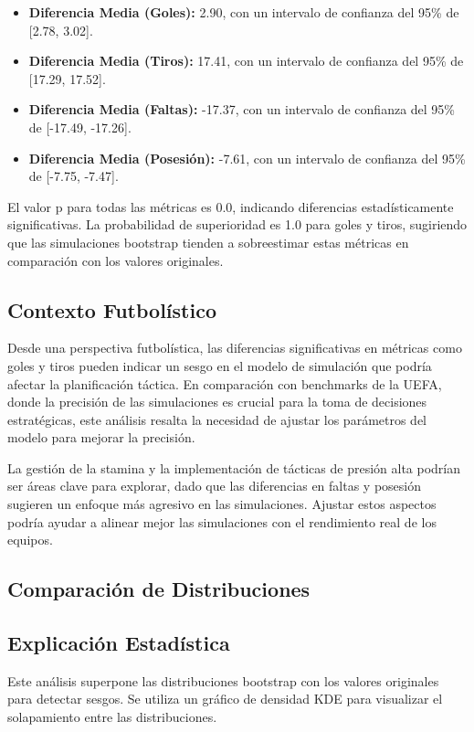 \documentclass{article}
\begin{document}
\begin{itemize}
    \item \textbf{Diferencia Media (Goles):} 2.90, con un intervalo de confianza del 95\% de [2.78, 3.02].
    \item \textbf{Diferencia Media (Tiros):} 17.41, con un intervalo de confianza del 95\% de [17.29, 17.52].
    \item \textbf{Diferencia Media (Faltas):} -17.37, con un intervalo de confianza del 95\% de [-17.49, -17.26].
    \item \textbf{Diferencia Media (Posesión):} -7.61, con un intervalo de confianza del 95\% de [-7.75, -7.47].
\end{itemize}

El valor p para todas las métricas es 0.0, indicando diferencias estadísticamente significativas. La probabilidad de superioridad es 1.0 para goles y tiros, sugiriendo que las simulaciones bootstrap tienden a sobreestimar estas métricas en comparación con los valores originales.

\subsection*{Contexto Futbolístico}
Desde una perspectiva futbolística, las diferencias significativas en métricas como goles y tiros pueden indicar un sesgo en el modelo de simulación que podría afectar la planificación táctica. En comparación con benchmarks de la UEFA, donde la precisión de las simulaciones es crucial para la toma de decisiones estratégicas, este análisis resalta la necesidad de ajustar los parámetros del modelo para mejorar la precisión.

La gestión de la stamina y la implementación de tácticas de presión alta podrían ser áreas clave para explorar, dado que las diferencias en faltas y posesión sugieren un enfoque más agresivo en las simulaciones. Ajustar estos aspectos podría ayudar a alinear mejor las simulaciones con el rendimiento real de los equipos.

\subsection{Comparación de Distribuciones}
\subsection*{Explicación Estadística}
Este análisis superpone las distribuciones bootstrap con los valores originales para detectar sesgos. Se utiliza un gráfico de densidad KDE para visualizar el solapamiento entre las distribuciones.
\end{document}
